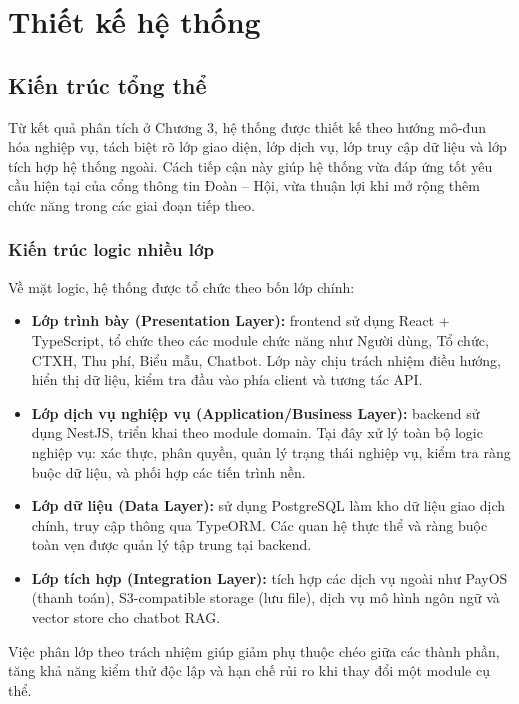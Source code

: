 \section{Thiết kế hệ thống}

\subsection{Kiến trúc tổng thể}
Từ kết quả phân tích ở Chương 3, hệ thống được thiết kế theo hướng mô-đun hóa nghiệp vụ, tách biệt rõ lớp giao diện, lớp dịch vụ, lớp truy cập dữ liệu và lớp tích hợp hệ thống ngoài. Cách tiếp cận này giúp hệ thống vừa đáp ứng tốt yêu cầu hiện tại của cổng thông tin Đoàn -- Hội, vừa thuận lợi khi mở rộng thêm chức năng trong các giai đoạn tiếp theo.

\subsubsection{Kiến trúc logic nhiều lớp}
Về mặt logic, hệ thống được tổ chức theo bốn lớp chính:
\begin{itemize}
	\item \textbf{Lớp trình bày (Presentation Layer):} frontend sử dụng React + TypeScript, tổ chức theo các module chức năng như Người dùng, Tổ chức, CTXH, Thu phí, Biểu mẫu, Chatbot. Lớp này chịu trách nhiệm điều hướng, hiển thị dữ liệu, kiểm tra đầu vào phía client và tương tác API.
	\item \textbf{Lớp dịch vụ nghiệp vụ (Application/Business Layer):} backend sử dụng NestJS, triển khai theo module domain. Tại đây xử lý toàn bộ logic nghiệp vụ: xác thực, phân quyền, quản lý trạng thái nghiệp vụ, kiểm tra ràng buộc dữ liệu, và phối hợp các tiến trình nền.
	\item \textbf{Lớp dữ liệu (Data Layer):} sử dụng PostgreSQL làm kho dữ liệu giao dịch chính, truy cập thông qua TypeORM. Các quan hệ thực thể và ràng buộc toàn vẹn được quản lý tập trung tại backend.
	\item \textbf{Lớp tích hợp (Integration Layer):} tích hợp các dịch vụ ngoài như PayOS (thanh toán), S3-compatible storage (lưu file), dịch vụ mô hình ngôn ngữ và vector store cho chatbot RAG.
\end{itemize}

Việc phân lớp theo trách nhiệm giúp giảm phụ thuộc chéo giữa các thành phần, tăng khả năng kiểm thử độc lập và hạn chế rủi ro khi thay đổi một module cụ thể.

